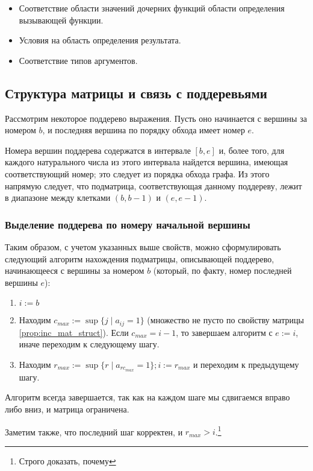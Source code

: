 \documentclass[12pt,a4paper]{amsart}
\begin{document}
\begin{itemize}
  \item Соответствие области значений дочерних функций области определения вызывающей функции.
  \item Условия на область определения результата.
  \item Соответствие типов аргументов.
\end{itemize}

\subsection{Структура матрицы и связь с поддеревьями}

Рассмотрим некоторое поддерево выражения. Пусть оно начинается с вершины за номером $b$, и последняя вершина по порядку
обхода имеет номер $e$.

Номера вершин поддерева содержатся в интервале $[b, e]$ и, более того, для каждого натурального числа из этого интервала
найдется вершина, имеющая соответствующий номер; это следует из порядка обхода графа. Из этого напрямую следует, что
подматрица, соответствующая данному поддереву, лежит в диапазоне между клетками $(b, b - 1)$ и $(e, e - 1)$.

\subsubsection{Выделение поддерева по номеру начальной вершины} Таким образом, с учетом указанных выше свойств, можно
сформулировать следующий алгоритм нахождения подматрицы, описывающей поддерево, начинающееся с вершины за номером $b$
(который, по факту, номер последней вершины $e$):

\begin{enumerate}
  \item $i := b$
  \item Находим $ c_{max} := \sup \{ j \mid a_{ij} = 1 \}$ (множество не пусто по свойству матрицы \ref{prop:inc_mat_struct}).
	Если $ c_{max} = i - 1 $, то завершаем алгоритм с $e := i$, иначе переходим к следующему шагу.
  \item Находим $ r_{max} := \sup \{ r \mid a_{rc_{max}} = 1 \}; i := r_{max} $ и переходим к предыдущему шагу.
\end{enumerate}

Алгоритм всегда завершается, так как на каждом шаге мы сдвигаемся вправо либо вниз, и матрица ограничена.

Заметим также, что последний шаг корректен, и $ r_{max} > i $.\footnote{Строго доказать, почему}
\end{document}
